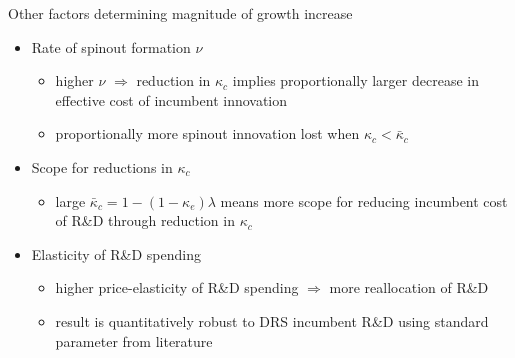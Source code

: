 \documentclass[english,usenames,dvipsnames]{beamer}
\begin{document}
\begin{frame}{Other factors determining magnitude of growth increase}\label{other_factors}
	\hyperlink{reducing_kappa_c_table}{}
	\begin{itemize}
		\item <+-> Rate of spinout formation $\nu$
		\begin{itemize}
			\item higher $\nu$ $\Rightarrow$ reduction in $\kappa_c$ implies proportionally larger decrease in effective cost of incumbent innovation
			\item proportionally more spinout innovation lost when $\kappa_c < \bar{\kappa}_c$ 
		\end{itemize}
		\medskip
		\item <+-> Scope for reductions in $\kappa_c$
		\begin{itemize}
			\item large $\bar{\kappa}_c = 1 - (1-\kappa_e)\lambda $ means more scope for reducing incumbent cost of R\&D through reduction in $\kappa_c$
		\end{itemize}
		\medskip
		\item <+-> Elasticity of R\&D spending 
		\begin{itemize}
			\item higher price-elasticity of R\&D spending $\Rightarrow$ more reallocation of R\&D
			\item result is quantitatively robust to DRS incumbent R\&D using standard parameter from literature 
		\end{itemize}
	\end{itemize}
\end{frame}
\end{document}
